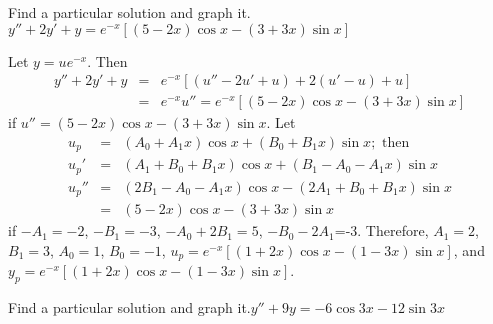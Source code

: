 \documentclass{ximera}
\begin{document}
\begin{problem}\label{exer:5.5.18} Find a particular solution and graph
it. $y''+2y'+y=e^{-x}\left[(5-2x)\cos
x-(3+3x)\sin x\right]$

\begin{solution}
    Let $y=ue^{-x}$. Then
\begin{eqnarray*}
y''+2y'+y&=&e^{-x}\left[(u''-2u'+u)+2(u'-u)+u\right]\\ &=&
e^{-x}u''=e^{-x}\left[(5-2x)\cos x-(3+3x)\sin x\right]
\end{eqnarray*}
 if $u''=(5-2x)\cos x-(3+3x)\sin x$. Let
\begin{eqnarray*}
u_p&=&(A_0+A_1x)\cos x+(B_0+B_1x)\sin x; \mbox{ then}\\
u_p'&=&(A_1+B_0+B_1x)\cos x+(B_1-A_0-A_1x)\sin x\\
u_p''&=&(2B_1-A_0-A_1x)\cos x-(2A_1+B_0+B_1x)\sin x\\
&=&(5-2x)\cos x-(3+3x)\sin x
\end{eqnarray*}
if $-A_1=-2$, $-B_1=-3$, $-A_0+2B_1=5$, $-B_0-2A_1$=-3. Therefore,
$A_1=2$, $B_1=3$, $A_0=1$, $B_0=-1$, $u_p=e^{-x}\left[(1+2x)\cos
x-(1-3x)\sin x\right]$, and $y_p=e^{-x}\left[(1+2x)\cos x-(1-3x)\sin
x\right]$.
\end{solution}
\end{problem}

\begin{problem}\label{exer:5.5.19} Find a particular solution and graph
it.$y''+9y=-6\cos 3x-12\sin 3x$
\end{problem}
\end{document}
